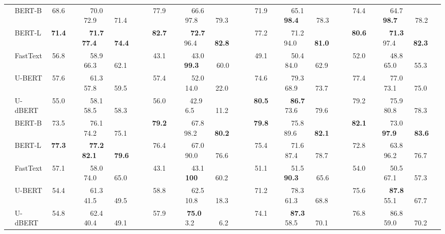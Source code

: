 \documentclass[11pt,a4paper]{article}
\begin{document}
\begin{table*}
{{\begin{tabular}{ll cc c cc c cc c cc}
\midrule
{} &
BERT-B   &   68.6   &   70.0~~~~~ 72.9~~~~~71.4   &      &   77.9   &   66.6~~~~~ {97.8}~~~~~79.3   &      &   71.9   &   65.1~~~~~ \textbf{98.4}~~~~~78.3   &      &   74.4   &   64.7~~~~~ \textbf{98.7}~~~~~78.2    \\
& BERT-L   &   \textbf{71.4}   &   \textbf{71.7}~~~~~ \textbf{77.4}~~~~~\textbf{74.4}  &      &   \textbf{82.7}   &   \textbf{72.7}~~~~~ 96.4~~~~~\textbf{82.8}   &      &   77.2   &   71.2~~~~~ 94.0~~~~~\textbf{81.0}   &      &   \textbf{80.6}   &   \textbf{71.3}~~~~~ 97.4~~~~~\textbf{82.3}   \\
& FastText   &   56.8   &   58.9~~~~~ 66.3~~~~~62.1   &      &   43.1   &   43.0~~~~~ \textbf{99.3}~~~~~60.0   &      &   49.1   &   50.4~~~~~ 84.0~~~~~62.9   &      &   52.0   &   48.8~~~~~ 65.0~~~~~55.3    \\ 
& U-BERT   &   57.6   &   61.3~~~~~ 57.8~~~~~59.5   &      &   57.4   &   52.0~~~~~ 14.0~~~~~22.0   &      &   74.6   &   79.3~~~~~ 68.9~~~~~73.7   &      &   77.4   &   77.0~~~~~ 73.1~~~~~75.0 \\
& U-dBERT   &   55.0   &   58.1~~~~~ 58.5~~~~~58.3   &      &   56.0   &   42.9~~~~~~ 6.5~~~~~~11.2   &      &   \textbf{80.5}   &   \textbf{86.7}~~~~~ 73.6~~~~~79.6   &      &  79.2   &   75.9~~~~~ 80.8~~~~~78.3 \\


\midrule
{} &
BERT-B   &   73.5   &   76.1~~~~~ 74.2~~~~~75.1   &      &   \textbf{79.2}   &   {67.8}~~~~~ {98.2}~~~~~\textbf{80.2}   &      &   \textbf{79.8}   &   75.8~~~~~ {89.6}~~~~~\textbf{82.1}   &      &   \textbf{82.1}   &   {73.0}~~~~~ \textbf{97.9}~~~~~\textbf{83.6}  \\
& BERT-L   &   \textbf{77.3}   &   \textbf{77.2}~~~~~ \textbf{82.1}~~~~~\textbf{79.6} &      &   76.4   &   67.0~~~~~ 90.0~~~~~76.6   &      &   75.4   &   71.6~~~~~ 87.4~~~~~78.7   &      &   72.8   &   63.8~~~~~ 96.2~~~~~76.7   \\
& FastText   &   57.1  &   58.0~~~~~ 74.0~~~~~65.0   &      &   43.1   &   43.1~~~~~ \textbf{100}~~~~~60.2  &      &   51.1   &   51.5~~~~~ \textbf{90.3}~~~~~65.6   &      &   54.0   &   50.5~~~~~ 67.1~~~~~57.3   \\ 

& U-BERT   &   54.4   &   61.3~~~~~ 41.5~~~~~49.5   &      &   58.8   &   62.5~~~~~ 10.8~~~~~18.3   &      &   71.2   &   78.3~~~~~ 61.3~~~~~68.8   &      &   75.6   &   \textbf{87.8}~~~~~ 55.1~~~~~67.7 \\
& U-dBERT   &   54.8   &   62.4~~~~~ 40.4~~~~~49.1   &      &   57.9   &   \textbf{75.0}~~~~~~~ 3.2~~~~~~~6.2   &      &   74.1   &   \textbf{87.3}~~~~~ 58.5~~~~~70.1   &      &   76.8   &   86.8~~~~~ 59.0~~~~~70.2 \\


\end{tabular}}}
\end{table*}
\end{document}
